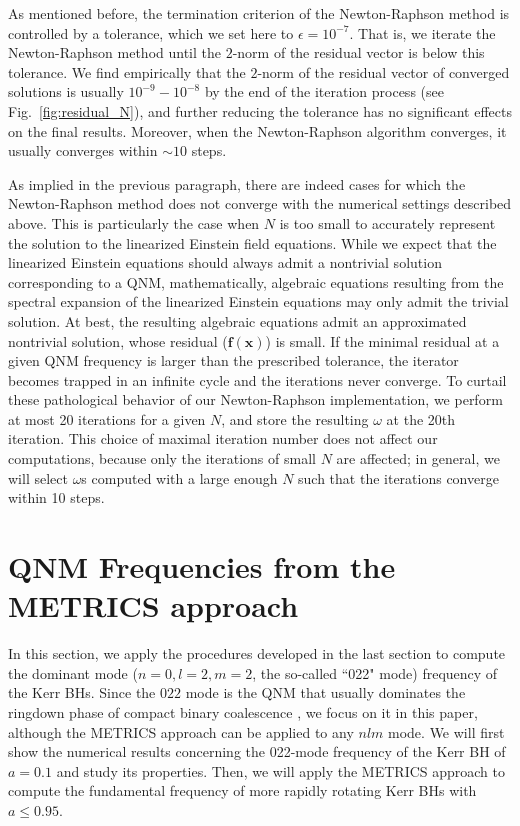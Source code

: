 \documentclass[aps,prx,amsmath,floats,floatfix,twocolumn,
  superscriptaddress,nofootinbib,showpacs]{revtex4-1}
\begin{document}
As mentioned before, the termination criterion of the Newton-Raphson method is controlled by a tolerance, which we set here to $\epsilon = 10^{-7}$. 
That is, we iterate the Newton-Raphson method until the $2$-norm of the residual vector is below this tolerance. 
We find empirically that the $2$-norm of the residual vector of converged solutions is usually $10^{-9} - 10^{-8}$ by the end of the iteration process (see Fig.~\ref{fig:residual_N}), and further reducing the tolerance has no significant effects on the final results. 
Moreover, when the Newton-Raphson algorithm converges, it usually converges within $\sim 10$ steps. 

As implied in the previous paragraph, there are indeed cases for which the Newton-Raphson method does not converge with the numerical settings described above. 
This is particularly the case when $N$ is too small to accurately represent the solution to the linearized Einstein field equations.
While we expect that the linearized Einstein equations should always admit a nontrivial solution corresponding to a QNM, mathematically, algebraic equations resulting from the spectral expansion of the linearized Einstein equations may only admit the trivial solution. 
At best, the resulting algebraic equations admit an approximated nontrivial solution, whose residual ($\textbf{f}(\textbf{x})$) is small. 
If the minimal residual at a given QNM frequency is larger than the prescribed tolerance, the iterator becomes trapped in an infinite cycle and the iterations never converge. 
To curtail these pathological behavior of our Newton-Raphson implementation, we perform at most 20 iterations for a given $N$, and store the resulting $\omega$ at the 20th iteration. 
This choice of maximal iteration number does not affect our computations, because only the iterations of small $N$ are affected; in general, we will select $\omega$s computed with a large enough $N$ such that the iterations converge within 10 steps.

\section{QNM Frequencies from the METRICS approach}
\label{sec:results}

In this section, we apply the procedures developed in the last section to compute the dominant mode ($n=0, l=2, m=2$, the so-called ``022" mode) frequency of the Kerr BHs. 
Since the $022$ mode is the QNM that usually dominates the ringdown phase of compact binary coalescence \cite{LIGOScientific:2021sio, pyRing_02, pyRing_03}, we focus on it in this paper, although the METRICS approach can be applied to any $nlm$ mode.
We will first show the numerical results concerning the 022-mode frequency of the Kerr BH of $a=0.1$ and study its properties. 
Then, we will apply the METRICS approach to compute the fundamental frequency of more rapidly rotating Kerr BHs with $a\leq 0.95$. 
\end{document}
